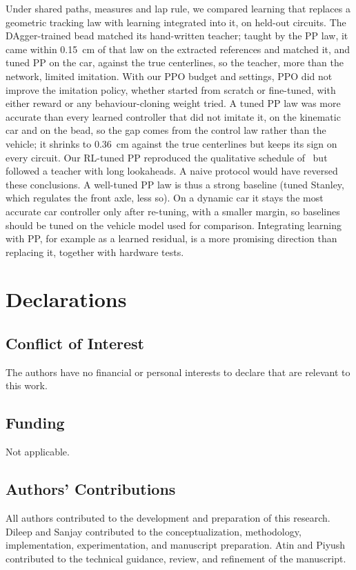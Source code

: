 \documentclass[10pt,twocolumn,twoside]{article}
\begin{document}
Under shared paths, measures and lap rule, we compared learning that replaces a
geometric tracking law with learning integrated into it, on held-out circuits.
The DAgger-trained bead matched its hand-written teacher; taught by the PP law,
it came within 0.15~cm of that law on the extracted references and matched it,
and tuned PP on the car, against the true centerlines, so the teacher, more than
the network, limited imitation. With our PPO budget and settings, PPO did not
improve the imitation policy, whether started from scratch or fine-tuned, with either reward
or any behaviour-cloning weight tried. A tuned PP law was more accurate than
every learned controller that did not imitate it, on the kinematic car and on the bead,
so the gap comes from the control law rather than the vehicle; it shrinks to
0.36~cm against the true centerlines but keeps its sign on every circuit. Our
RL-tuned PP reproduced the qualitative schedule of~\cite{elgouhary2026} but
followed a teacher with long lookaheads. A naive protocol would have reversed
these conclusions. A well-tuned PP law is thus a strong baseline (tuned Stanley,
which regulates the front axle, less so). On a dynamic car it stays the most
accurate car controller only after re-tuning, with a smaller margin, so
baselines should be tuned on the vehicle model used for comparison. Integrating
learning with PP, for example as a learned residual, is a more promising
direction than replacing it, together with hardware tests.

\section*{Declarations}

\subsection*{Conflict of Interest}
The authors have no financial or personal interests to declare that are
relevant to this work.

\subsection*{Funding}
Not applicable.

\subsection*{Authors' Contributions}
All authors contributed to the development and preparation of this research. Dileep and Sanjay contributed to the conceptualization, methodology, implementation, experimentation, and manuscript preparation. Atin and Piyush contributed to the technical guidance, review, and refinement of the manuscript.
\end{document}
